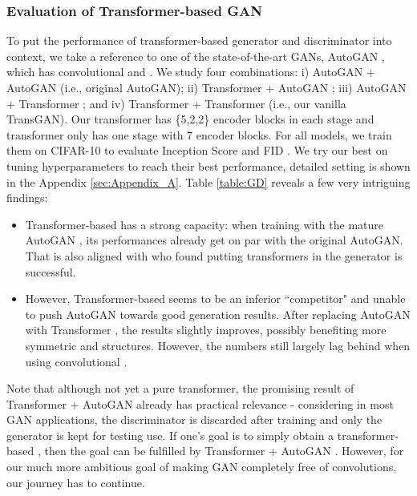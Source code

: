 \documentclass{article}
\begin{document}
\subsubsection{Evaluation of Transformer-based GAN}
\label{sec:combination}
To put the performance of transformer-based generator  and discriminator  into context, we take a reference to one of the state-of-the-art GANs,  AutoGAN \cite{gong2019autogan}, which has convolutional  and .  We study four combinations: i) AutoGAN  + AutoGAN  (i.e., original AutoGAN);  ii) Transformer  + AutoGAN ; iii) AutoGAN  + Transformer ; and iv) Transformer  + Transformer  (i.e., our vanilla TransGAN). Our transformer  has \{5,2,2\} encoder blocks in each stage and transformer  only has one stage with 7 encoder blocks. For all models, we train them on CIFAR-10 to evaluate Inception Score \cite{salimans2016improved} and FID \cite{heusel2017gans}. We try our best on tuning hyperparameters to reach their best performance, detailed setting is shown in the Appendix \ref{sec:Appendix_A}. Table \ref{table:GD} reveals a few very intriguing findings:
\begin{itemize}
\vspace{-0.5em}
    \item Transformer-based  has a strong capacity: when training with the mature AutoGAN , its performances already get on par with the original AutoGAN. That is also aligned with \cite{esser2020taming} who found putting transformers in the generator is successful.\vspace{-0.3em}  
    \item However, Transformer-based  seems to be an inferior ``competitor" and unable to push AutoGAN  towards good generation results. After replacing AutoGAN  with Transformer  , the results slightly improves, possibly benefiting more symmetric  and  structures. However, the numbers still largely lag behind when using convolutional .
    \vspace{-0.5em}
\end{itemize}
Note that although not yet a pure transformer, the promising result of Transformer  + AutoGAN  already has practical relevance - considering in most GAN applications, the discriminator is discarded after training and only the generator is kept for testing use. If one's goal is to simply obtain a transformer-based , then the goal can be fulfilled by Transformer  + AutoGAN . However, for our much more ambitious goal of making GAN completely free of convolutions, our journey has to continue.
\end{document}
